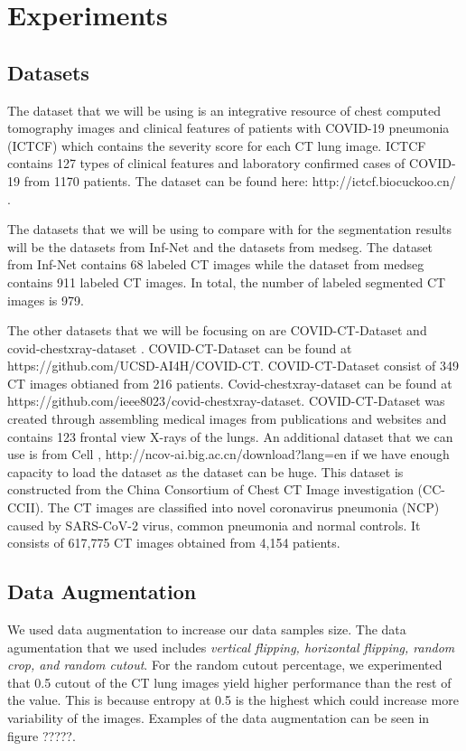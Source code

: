 \section{Experiments}

\subsection{Datasets}
The dataset that we will be using is an integrative resource of chest computed tomography images and clinical features of patients with COVID-19 pneumonia (ICTCF) \cite{ref23} which contains the severity score for each CT lung image. ICTCF contains 127 types of clinical features and laboratory confirmed cases of COVID-19 from 1170 patients. The dataset can be found here: http://ictcf.biocuckoo.cn/ . 

The datasets that we will be using to compare with for the segmentation results will be the datasets from Inf-Net\cite{ref14} and the datasets from medseg\cite{ref26}. The dataset from Inf-Net\cite{ref14} contains 68 labeled CT images while the dataset from medseg contains 911 labeled CT images. In total, the number of labeled segmented CT images is 979.

The other datasets that we will be focusing on are COVID-CT-Dataset \cite{ref21} and covid-chestxray-dataset \cite{ref22}. COVID-CT-Dataset can be found at https://github.com/UCSD-AI4H/COVID-CT. COVID-CT-Dataset consist of 349 CT images obtianed from 216 patients. Covid-chestxray-dataset can be found at https://github.com/ieee8023/covid-chestxray-dataset. COVID-CT-Dataset  was created through assembling medical images from publications and websites and contains 123 frontal view X-rays of the lungs. An additional dataset that we can use is from Cell \cite{ref24}, http://ncov-ai.big.ac.cn/download?lang=en if we have enough capacity to load the dataset as the dataset can be huge. This dataset is constructed from the China Consortium of Chest CT Image investigation (CC-CCII). The CT images are classified into novel coronavirus pneumonia (NCP) caused by SARS-CoV-2 virus, common pneumonia and normal controls. It consists of 617,775 CT images obtained from 4,154 patients.

\subsection{Data Augmentation}
We used data augmentation to increase our data samples size. The data agumentation that we used includes \textit{vertical flipping, horizontal flipping, random crop, and random cutout}. For the random cutout percentage, we experimented that 0.5 cutout of the CT lung images yield higher performance than the rest of the value. This is because entropy at 0.5 is the highest which could increase more variability of the images. Examples of the data augmentation can be seen in figure ?????.

